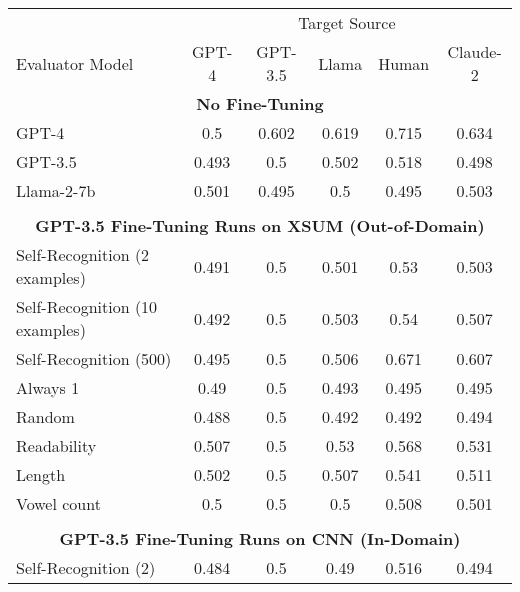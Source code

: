 \begin{table}[h]
    \centering
    \begin{tabular}{l|ccccc}
                                           & \multicolumn{5}{c}{Target Source} \\ 
        Evaluator Model                    & GPT-4 & GPT-3.5 & Llama & Human & Claude-2 \\
        \hline
        \multicolumn{6}{c}{\textbf{No Fine-Tuning}} \\
        GPT-4                              & 0.5        & 0.602      & 0.619      & 0.715      & 0.634      \\
        GPT-3.5                            & 0.493      & 0.5        & 0.502      & 0.518      & 0.498      \\
        Llama-2-7b                         & 0.501      & 0.495      & 0.5        & 0.495      & 0.503      \\
        \multicolumn{6}{c}{} \\
        \multicolumn{6}{c}{\textbf{GPT-3.5 Fine-Tuning Runs on XSUM (Out-of-Domain)}} \\
        Self-Recognition (2 examples)              & 0.491      & 0.5        & 0.501      & 0.53       & 0.503      \\
        Self-Recognition (10 examples)             & 0.492      & 0.5        & 0.503      & 0.54       & 0.507      \\
        Self-Recognition (500)                     & 0.495      & 0.5        & 0.506      & 0.671      & 0.607      \\
        Always 1                           & 0.49       & 0.5        & 0.493      & 0.495      & 0.495      \\
        Random                             & 0.488      & 0.5        & 0.492      & 0.492      & 0.494      \\
        Readability                        & 0.507      & 0.5        & 0.53       & 0.568      & 0.531      \\
        Length                             & 0.502      & 0.5        & 0.507      & 0.541      & 0.511      \\
        Vowel count                        & 0.5        & 0.5        & 0.5        & 0.508      & 0.501      \\
        \multicolumn{6}{c}{} \\
        \multicolumn{6}{c}{\textbf{GPT-3.5 Fine-Tuning Runs on CNN (In-Domain)}} \\
        Self-Recognition (2)                       & 0.484      & 0.5        & 0.49       & 0.516      & 0.494      \\

\end{tabular}
\end{table}
